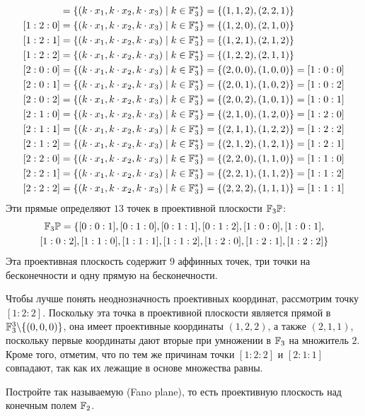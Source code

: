 \begin{example}
\begin{align*}
[1:1:2]&= \{(k\cdot x_1,k\cdot x_2, k\cdot x_3)\;|\; k\in\F_3^*\}
          = \{(1,1,2), (2,2,1)\}\\
[1:2:0] &= \{(k\cdot x_1,k\cdot x_2, k\cdot x_3)\;|\; k\in\F_3^*\}
          = \{(1,2,0), (2,1,0)\}\\
[1:2:1] &= \{(k\cdot x_1,k\cdot x_2, k\cdot x_3)\;|\; k\in\F_3^*\}
          = \{(1,2,1), (2,1,2)\}\\
[1:2:2] &= \{(k\cdot x_1,k\cdot x_2, k\cdot x_3)\;|\; k\in\F_3^*\}
          = \{(1,2,2), (2,1,1)\}\\
[2:0:0] &= \{(k\cdot x_1,k\cdot x_2, k\cdot x_3)\;|\; k\in\F_3^*\}
          = \{(2,0,0), (1,0,0)\}
          = [1:0:0]\\
[2:0:1] &= \{(k\cdot x_1,k\cdot x_2, k\cdot x_3)\;|\; k\in\F_3^*\}
          = \{(2,0,1), (1,0,2)\}
          = [1:0:2]\\
[2:0:2] &= \{(k\cdot x_1,k\cdot x_2, k\cdot x_3)\;|\; k\in\F_3^*\}
          = \{(2,0,2), (1,0,1)\}
          = [1:0:1]\\
[2:1:0] &= \{(k\cdot x_1,k\cdot x_2, k\cdot x_3)\;|\; k\in\F_3^*\}
          = \{(2,1,0), (1,2,0)\}
          = [1:2:0]\\
[2:1:1] &= \{(k\cdot x_1,k\cdot x_2, k\cdot x_3)\;|\; k\in\F_3^*\}
          = \{(2,1,1), (1,2,2)\}
          = [1:2:2]\\
[2:1:2] &= \{(k\cdot x_1,k\cdot x_2, k\cdot x_3)\;|\; k\in\F_3^*\}
          = \{(2,1,2), (1,2,1)\}
          = [1:2:1]\\
[2:2:0] &= \{(k\cdot x_1,k\cdot x_2, k\cdot x_3)\;|\; k\in\F_3^*\}
          = \{(2,2,0), (1,1,0)\}
          = [1:1:0]\\
[2:2:1] &= \{(k\cdot x_1,k\cdot x_2, k\cdot x_3)\;|\; k\in\F_3^*\}
          = \{(2,2,1), (1,1,2)\}
          = [1:1:2]\\
[2:2:2] &= \{(k\cdot x_1,k\cdot x_2, k\cdot x_3)\;|\; k\in\F_3^*\}
          = \{(2,2,2), (1,1,1)\}
          = [1:1:1]
\end{align*}
Эти прямые определяют $13$ точек в проективной плоскости $\mathbb{F}_3\mathbb{P}$:
\begin{multline*}
\mathbb{F}_3\mathbb{P} = \{ [0:0:1], [0:1:0], [0:1:1], [0:1:2], [1:0:0], [1:0:1], \\ [1:0:2], [1:1:0], [1:1:1], [1:1:2], [1:2:0], [1:2:1], [1:2:2]\}
\end{multline*}
Эта проективная плоскость содержит $9$ аффинных точек, три точки на бесконечности и одну прямую на бесконечности.

Чтобы лучше понять неоднозначность проективных координат, рассмотрим точку $[1:2:2]$. Поскольку эта точка в проективной плоскости является прямой в $\mathbb{F}_3^3\backslash\{(0,0,0)\}$, она имеет проективные координаты $(1,2,2)$, а также $(2,1,1)$, поскольку первые координаты дают вторые при умножении в $\mathbb{F}_3$ на множитель $2$. Кроме того, отметим, что по тем же причинам точки $[1:2:2]$ и $[2:1:1]$ совпадают, так как их лежащие в основе множества равны.
\end{example}
\begin{exercise}
Постройте так называемую  (Fano plane), то есть проективную плоскость над конечным полем $\mathbb{F}_2$.
\end{exercise}
